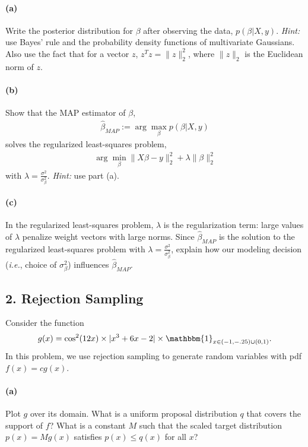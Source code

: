 \documentclass[a4paper,twoside,11pt]{article}
\begin{document}
\paragraph{(a)} Write the posterior distribution for $\beta$ after observing the data, $p(\beta | X,y)$. {\sl Hint:} use Bayes' rule and the probability density functions of multivariate Gaussians. Also use the fact that for a vector $z$, $z^Tz = \|z\|_2^2$, where $\|z\|_2$ is the Euclidean norm of $z$.
    
\paragraph{(b)} Show that the MAP estimator of $\beta$,
     \begin{align*}
         \hat{\beta}_{MAP} := \arg\max_\beta p(\beta | X, y)
     \end{align*}
     solves the regularized least-squares problem, 
     \begin{align*}
         \arg \min_\beta  \| X \beta - y \|_2^2 + \lambda \|\beta \|_2^2
     \end{align*}
     with $\lambda = \frac{\sigma^2}{ \sigma_\beta^2}$. {\sl Hint:} use part (a).
        
\paragraph{(c)} In the regularized least-squares problem, $\lambda$ is the regularization term: large values of $\lambda$ penalize weight vectors with large norms. Since $\hat\beta_{MAP}$ is the solution to the regularized least-squares problem with $\lambda = \frac{\sigma^2}{ \sigma_\beta^2}$, explain how our modeling decision (\textit{i.e.}, choice of $\sigma_\beta^2$) influences $\hat\beta_{MAP}$.  \newpage 
    
\subsection*{2. Rejection Sampling}

Consider the function 
\[
g(x) = \cos^2(12x)\times |x^3+6x-2| \times \mathbbm{1}_{x\in (-1, -.25)\cup (0, 1)}.
\]
In this problem, we use rejection sampling to generate random variables with pdf $f(x) = cg(x)$. 

\paragraph{(a)} Plot $g$ over its domain. What is a uniform proposal distribution $q$ that covers the support of $f$? What is a constant $M$ such that the scaled target distribution $p(x) = Mg(x)$ satisfies $p(x)\le q(x)$ for all $x$?
\end{document}
